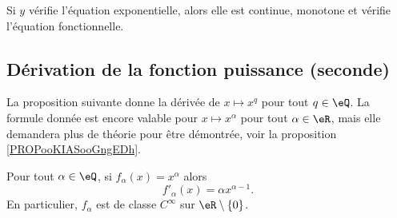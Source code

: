 \begin{proposition}       \label{PROPooLTLWooBGcXAZ}
	Si \( y\) vérifie l'équation exponentielle, alors elle est continue, monotone et vérifie l'équation fonctionnelle.
\end{proposition}

\subsection{Dérivation de la fonction puissance (seconde)}

La proposition suivante donne la dérivée de \( x\mapsto x^q\) pour tout \( q\in \eQ\). La formule donnée est encore valable pour \( x\mapsto x^{\alpha}\) pour tout \( \alpha\in \eR\), mais elle demandera plus de théorie pour être démontrée, voir la proposition \ref{PROPooKIASooGngEDh}.
\begin{proposition}     \label{PROPooSGLGooIgzque}
	Pour tout \( \alpha\in \eQ\), si \( f_{\alpha}(x)=x^{\alpha}\) alors
	\begin{equation}
		f'_{\alpha}(x)=\alpha x^{\alpha-1}.
	\end{equation}
	En particulier, \( f_{\alpha}\) est de classe \(  C^{\infty}\) sur \( \eR\setminus\{ 0 \}\).
\end{proposition}

